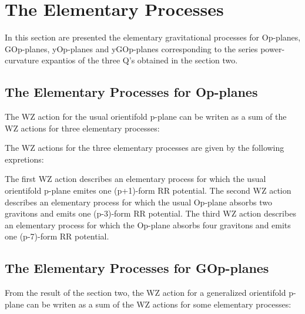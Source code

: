 \documentclass[a4paper,a4paper]{article}
\begin{document}
\section{The Elementary Processes}

In this section are presented the elementary gravitational processes for Op-planes, GOp-planes, yOp-planes and yGOp-planes corresponding to the series power-curvature expantios of the three Q's obtained in the section two.
\subsection{The Elementary Processes for Op-planes }
The WZ action for the usual orientifold p-plane can be writen as a sum of the WZ actions for three elementary processes:

\begin{center}
{  \coordHE{} }
\end{center}
The WZ actions for the three elementary processes are given by the following 
expretions:
\begin{center}
{  \coordHE{} }
\end{center} 
\begin{center}
{  \coordHE{} }
\end{center}
\begin{center}
{  \coordHE{} }
\end{center}
The first WZ action describes an elementary process for which the usual orientifold p-plane emites one (p+1)-form RR potential.
The second WZ action describes an elementary process for which the usual
Op-plane absorbs two gravitons and emits one (p-3)-form RR potential.
The third WZ action describes an elementary process for which the Op-plane absorbs four gravitons and emits one (p-7)-form RR potential.
\subsection{The Elementary Processes for GOp-planes } 
From the result of the section two, the WZ action for a generalized orientifold p-plane can be writen as a sum of the WZ actions for some elementary processes:
\begin{center}
{  \coordHE{} }
\end{center}
\end{document}
